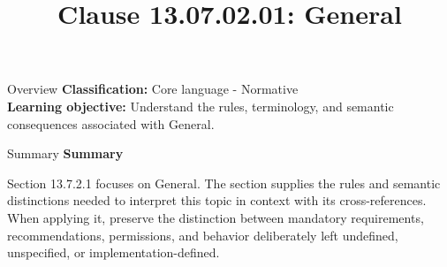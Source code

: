\documentclass[10pt,letterpaper]{article}
\title{Clause 13.07.02.01: General}
\author{}
\date{}
\begin{document}
\maketitle
\begin{CornellOverviewBox}{Overview}
\textbf{Classification:} Core language - Normative\\[2pt]
\textbf{Learning objective:} Understand the rules, terminology, and semantic consequences associated with General.
\end{CornellOverviewBox}\begin{CornellSummaryBox}{Summary}
{\sffamily\bfseries\color{Accent} Summary}\par\vspace{3pt}Section 13.7.2.1 focuses on General. The section supplies the rules and semantic distinctions needed to interpret this topic in context with its cross-references. When applying it, preserve the distinction between mandatory requirements, recommendations, permissions, and behavior deliberately left undefined, unspecified, or implementation-defined.
\end{CornellSummaryBox}
\end{document}

